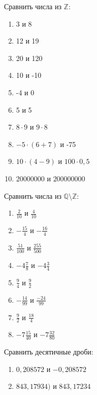 \documentclass[algebra,twocolumn]{pum}
\begin{document}
\begin{exercises}
  \begin{question}
    Сравнить числа из $\mathbb{Z}$:
    \begin{multicols}{2}
      \begin{enumerate}[label=\arabic*)]
        \item 3 и 8
        \item 12 и 19
        \item 20 и 120
        \item 10 и -10
        \item -4 и 0
        \item 5 и 5
        \item $8\cdot9$ и $9\cdot8$ 
        \item $-5\cdot(6+7)$ и -75
        \item $10\cdot(4-9)$ и $100\cdot0,5$
        \item $20000000$ и $200000000$
      \end{enumerate}
    \end{multicols}
  \end{question}
  \begin{question}
    Сравнить числа из $\mathbb{Q}\setminus\mathbb{Z}$:
    \begin{multicols}{2}
      \begin{enumerate}[label=\arabic*)]
        \item $\frac{2}{10}$ и $\frac{4}{10}$
        \item $-\frac{15}{4}$ и $-\frac{16}{4}$
        \item $\frac{51}{100}$ и $\frac{255}{500}$
        \item $-4\frac{7}{8}$ и $-4\frac{3}{4}$
        \item $\frac{9}{4}$ и $\frac{9}{2}$
        \item $-\frac{14}{99}$ и $\frac{-24}{99}$
        \item $\frac{9}{2}$ и $\frac{18}{4}$
        \item $-7\frac{15}{40}$ и $-7\frac{32}{80}$
      \end{enumerate}
    \end{multicols}
  \end{question}
  \begin{question}
    Сравнить десятичные дроби:
    \begin{enumerate}[nosep]
        \item $0,208572$ и $-0,208572$
        \item $843,17934)$ и $843,17234$

\end{enumerate}
\end{question}
\end{exercises}
\end{document}
